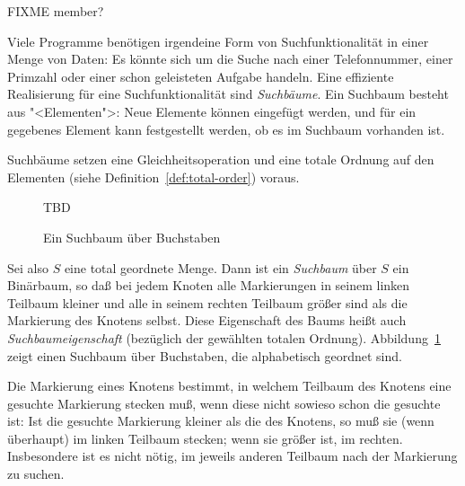 FIXME member?

Viele Programme benötigen irgendeine Form von Suchfunktionalität in
einer Menge von Daten: Es könnte sich um die Suche nach einer
Telefonnummer, einer Primzahl oder einer schon geleisteten Aufgabe
handeln.  Eine effiziente Realisierung für eine Suchfunktionalität
sind \textit{Suchbäume}.  Ein Suchbaum besteht aus
"<Elementen">: Neue Elemente können eingefügt werden, und für ein
gegebenes Element kann festgestellt werden, ob es im Suchbaum
vorhanden ist.

Suchbäume setzen eine Gleichheitsoperation und eine totale Ordnung auf
den Elementen (siehe Definition~\ref{def:total-order}) voraus.

\begin{figure}[tb]
  TBD
  \caption{Ein Suchbaum über Buchstaben}
  \label{fig:searchtree}
\end{figure}

 Sei also $S$ eine total geordnete
Menge.  Dann ist ein \textit{Suchbaum} über $S$ ein Binärbaum, so daß bei
jedem Knoten alle Markierungen in seinem linken Teilbaum kleiner und
alle in seinem rechten Teilbaum größer sind als die Markierung des Knotens
selbst.  Diese Eigenschaft des Baums heißt auch
\textit{Suchbaumeigenschaft} (bezüglich der gewählten totalen
Ordnung).
Abbildung~\ref{fig:searchtree} zeigt einen Suchbaum über Buchstaben,
die alphabetisch geordnet sind.

Die Markierung eines Knotens bestimmt,
in welchem Teilbaum
des Knotens eine gesuchte Markierung stecken muß, wenn diese nicht sowieso schon die gesuchte ist: Ist die gesuchte
Markierung kleiner als die des Knotens, so muß sie (wenn überhaupt) im
linken Teilbaum stecken; wenn sie größer ist, im rechten.
Insbesondere ist es nicht nötig, im jeweils anderen Teilbaum nach der
Markierung zu suchen.


